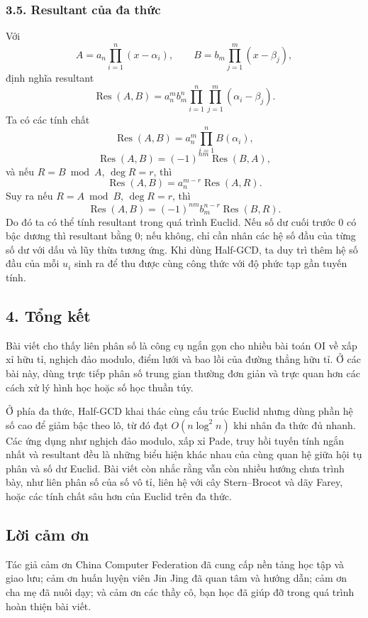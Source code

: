 \documentclass[11pt]{article}
\begin{document}
\subsubsection*{3.5. Resultant của đa thức}

Với
\[
  A=a_n\prod_{i=1}^{n}(x-\alpha_i),\qquad
  B=b_m\prod_{j=1}^{m}(x-\beta_j),
\]
định nghĩa resultant
\[
  \operatorname{Res}(A,B)
  =
  a_n^m b_m^n
  \prod_{i=1}^{n}\prod_{j=1}^{m}(\alpha_i-\beta_j).
\]
Ta có các tính chất
\[
  \operatorname{Res}(A,B)=a_n^m\prod_{i=1}^{n}B(\alpha_i),
\]
\[
  \operatorname{Res}(A,B)=(-1)^{nm}\operatorname{Res}(B,A),
\]
và nếu \(R=B\bmod A\), \(\deg R=r\), thì
\[
  \operatorname{Res}(A,B)=a_n^{m-r}\operatorname{Res}(A,R).
\]
Suy ra nếu \(R=A\bmod B\), \(\deg R=r\), thì
\[
  \operatorname{Res}(A,B)=(-1)^{nm} b_m^{n-r}\operatorname{Res}(B,R).
\]
Do đó ta có thể tính resultant trong quá trình Euclid. Nếu số dư cuối trước
\(0\) có bậc dương thì resultant bằng \(0\); nếu không, chỉ cần nhân các hệ
số đầu của từng số dư với dấu và lũy thừa tương ứng. Khi dùng Half-GCD, ta
duy trì thêm hệ số đầu của mỗi \(u_i\) sinh ra để thu được cùng công thức với
độ phức tạp gần tuyến tính.

\subsection*{4. Tổng kết}

Bài viết cho thấy liên phân số là công cụ ngắn gọn cho nhiều bài toán OI về
xấp xỉ hữu tỉ, nghịch đảo modulo, điểm lưới và bao lồi của đường thẳng hữu
tỉ. Ở các bài này, dùng trực tiếp phân số trung gian thường đơn giản và trực
quan hơn các cách xử lý hình học hoặc số học thuần túy.

Ở phía đa thức, Half-GCD khai thác cùng cấu trúc Euclid nhưng dùng phần hệ số
cao để giảm bậc theo lô, từ đó đạt \(O(n\log^2 n)\) khi nhân đa thức đủ nhanh.
Các ứng dụng như nghịch đảo modulo, xấp xỉ Pade, truy hồi tuyến tính ngắn
nhất và resultant đều là những biểu hiện khác nhau của cùng quan hệ giữa hội
tụ phân và số dư Euclid. Bài viết còn nhắc rằng vẫn còn nhiều hướng chưa trình
bày, như liên phân số của số vô tỉ, liên hệ với cây Stern--Brocot và dãy
Farey, hoặc các tính chất sâu hơn của Euclid trên đa thức.

\subsection*{Lời cảm ơn}

Tác giả cảm ơn China Computer Federation đã cung cấp nền tảng học tập và giao
lưu; cảm ơn huấn luyện viên Jin Jing đã quan tâm và hướng dẫn; cảm ơn cha mẹ
đã nuôi dạy; và cảm ơn các thầy cô, bạn học đã giúp đỡ trong quá trình hoàn
thiện bài viết.
\end{document}
